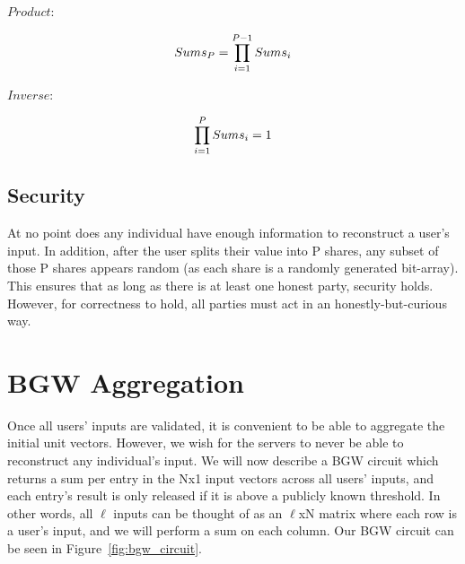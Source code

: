 \documentclass[conference]{IEEEtran}
\begin{document}
\begin{flushleft}
$Product$:\\
\end{flushleft}
\begin{equation*}
Sums_P = \prod_{i = 1}^{P - 1} Sums_i\\
\end{equation*}

\begin{flushleft}
$Inverse$:\\
\end{flushleft}
\begin{equation*}
\prod_{i = 1}^{P} Sums_i = 1\\
\end{equation*}
\hfill\newline

\subsection{Security}
At no point does any individual have enough information to reconstruct a user's input. In addition, after the user splits their value into P shares, any subset of those P shares appears random (as each share is a randomly generated bit-array). This ensures that as long as there is at least one honest party, security holds. However, for correctness to hold, all parties must act in an honestly-but-curious way.\\



\section{BGW Aggregation}
Once all users' inputs are validated, it is convenient to be able to aggregate the initial unit vectors. However, we wish for the servers to never be able to reconstruct any individual's input. We will now describe a BGW circuit which returns a sum per entry in the Nx1 input vectors across all users' inputs, and each entry's result is only released if it is above a publicly known threshold. In other words, all $\ell$ inputs can be thought of as an $\ell$xN matrix where each row is a user's input, and we will perform a sum on each column. Our BGW circuit can be seen in Figure~\ref{fig:bgw_circuit}.\\
\end{document}
